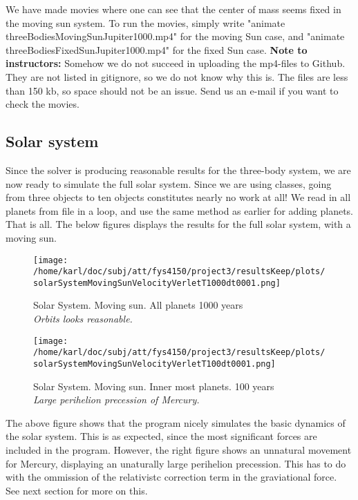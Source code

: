 \documentclass{article}
\begin{document}
We have made movies where one can see that the center of mass seems fixed in the moving sun system. To run the movies, simply write "animate threeBodiesMovingSunJupiter1000.mp4" for the moving Sun case, and "animate threeBodiesFixedSunJupiter1000.mp4" for the fixed Sun case. \textbf{Note to instructors:} Somehow we do not succeed in uploading the mp4-files to Github. They are not listed in gitignore, so we do not know why this is. The files are less than 150 kb, so space should not be an issue. Send us an e-mail if you want to check the movies.


\subsection{Solar system}
Since the solver is producing reasonable results for the three-body system, we are now ready to simulate the full solar system. Since we are using classes, going from three objects to ten objects constitutes nearly no work at all! We read in all planets from file in a loop, and use the same method as earlier for adding planets. That is all. The below figures displays the results for the full solar system, with a moving sun. \\


\begin{minipage}{.45\textwidth} 
	\begin{figure}[H]
		\centering
		\texttt{[image: /home/karl/doc/subj/att/fys4150/project3/resultsKeep/plots/solarSystemMovingSunVelocityVerletT1000dt0001.png]}
		\caption{Solar System. Moving sun. All planets 1000 years  \\ \textit{Orbits looks reasonable.}}
		\label{1}
	\end{figure}
\end{minipage}\hfill
\begin{minipage}{.45\textwidth} 
	\begin{figure}[H]
		\centering
		\texttt{[image: /home/karl/doc/subj/att/fys4150/project3/resultsKeep/plots/solarSystemMovingSunVelocityVerletT100dt0001.png]}
		\caption{Solar System. Moving sun. Inner most planets. 100 years  \\ \textit{Large perihelion precession of Mercury.}}
		\label{1}
	\end{figure}
\end{minipage}\hfill
\vspace{2ex}

The above figure shows that the program nicely simulates the basic dynamics of the solar system. This is as expected, since the most significant forces are included in the program. However, the right figure shows an unnatural movement for Mercury, displaying an unaturally large perihelion precession. This has to do with the ommission of the relativistc correction term in the graviational force. See next section for more on this.
\end{document}
